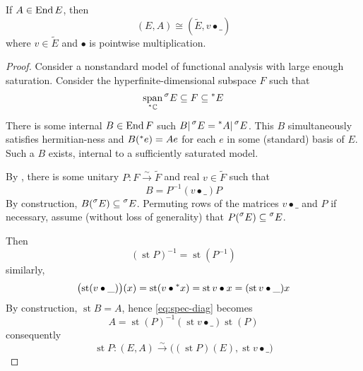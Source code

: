 \documentclass{scrartcl}
\newcommand{\hyper}[1]{\prescript{*}{}{#1}}
\newcommand{\standard}[1]{\prescript{\sigma}{}{#1}}
\DeclareMathOperator{\st}{st}
\begin{document}
\begin{theorem}
  If $A\in\operatorname{End} E$, then
  \[
    (E,A)\cong (\tilde E,v\bullet \_)
  \]
  where $v\in \tilde E$ 
  and $\bullet$ is pointwise multiplication. 
\end{theorem}
\begin{proof}
  Consider a nonstandard model of functional analysis with large enough saturation. 
  Consider the hyperfinite-dimensional subspace $F$ such that
  \[
    \Span_{\hyper \C}\standard E \subseteq F \subseteq \hyper E
  \]
  There is some internal $B\in\operatorname{End} F$ such $B|\standard E = \hyper A|\standard E$. This $B$ simultaneously satisfies hermitian-ness and $B(\hyper e)=Ae$ for each $e$ in some (standard) basis of $E$. Such a $B$ exists, internal to a sufficiently saturated model.

  By , there is some unitary $P:F\xrightarrow{\sim} \tilde F$ and real $v\in \tilde F$ such that
  \begin{equation}
    B = P^{-1}(v\bullet\_)P
    \label{eq:spec-diag}
  \end{equation}
  By construction, $B(\standard E) \subseteq \standard E$. Permuting rows of the matrices $v\bullet\_$ and $P$ if necessary, assume (without loss of generality) that $P(\standard E)\subseteq \standard E$. 
  
  Then
  \[
    (\st P)^{-1}=\st(P^{-1})
  \]
  similarly,
  \[
    \bigl(\st(v\bullet\_)\bigr)(x)=\st(v\bullet\hyper x) = \st v\bullet x = (\st v\bullet\_)x
  \]
  By construction, $\st B=A$, hence \cref{eq:spec-diag} becomes
  \[
    A=\st(P)^{-1} (\st v\bullet\_) \st(P)
  \]
  consequently
  \[
    \st P : (E,A) \xrightarrow{\sim} \bigl( (\st P)(E), \st v\bullet\_\bigr)
  \]
\end{proof}
\end{document}
